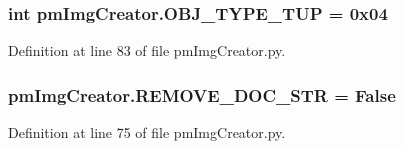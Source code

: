 \hypertarget{namespacepm_img_creator_a2d27005c7b2d92bcbe8d6ae55b2cbd42}{
\subsubsection[{O\-B\-J\-\_\-\-T\-Y\-P\-E\-\_\-\-T\-U\-P}]{\setlength{\rightskip}{0pt plus 5cm}int pm\-Img\-Creator.\-O\-B\-J\-\_\-\-T\-Y\-P\-E\-\_\-\-T\-U\-P = 0x04}}\label{namespacepm_img_creator_a2d27005c7b2d92bcbe8d6ae55b2cbd42}


Definition at line 83 of file pm\-Img\-Creator.\-py.

\hypertarget{namespacepm_img_creator_aa9a156305d90c5f6e1cab261db363edc}{
\subsubsection[{R\-E\-M\-O\-V\-E\-\_\-\-D\-O\-C\-\_\-\-S\-T\-R}]{\setlength{\rightskip}{0pt plus 5cm}pm\-Img\-Creator.\-R\-E\-M\-O\-V\-E\-\_\-\-D\-O\-C\-\_\-\-S\-T\-R = False}}\label{namespacepm_img_creator_aa9a156305d90c5f6e1cab261db363edc}


Definition at line 75 of file pm\-Img\-Creator.\-py.

